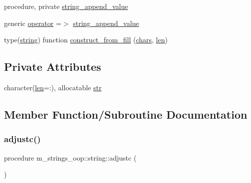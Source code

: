 \begin{DoxyCompactItemize}
procedure, private \mbox{\hyperlink{structm__strings__oop_1_1string_a8e08eb7c69c483503a9169375978cffd}{string\+\_\+append\+\_\+value}}
\item 
generic \mbox{\hyperlink{structm__strings__oop_1_1string_a079d7dd91faba60518e61f0634df7a6f}{operator}} =$>$ \mbox{\hyperlink{structm__strings__oop_1_1string_a8e08eb7c69c483503a9169375978cffd}{string\+\_\+append\+\_\+value}}
\item 
type(\mbox{\hyperlink{structm__strings__oop_1_1string}{string}}) function \mbox{\hyperlink{structm__strings__oop_1_1string_ab205d416fbeaaec946c2b847683d640e}{construct\+\_\+from\+\_\+fill}} (\mbox{\hyperlink{structm__strings__oop_1_1string_a84c1d60eaee6e6acc2dbee4bce6d64bb}{chars}}, \mbox{\hyperlink{structm__strings__oop_1_1string_acd9093a5a0ca686837cce1908846ae53}{len}})
\end{DoxyCompactItemize}
\subsection*{Private Attributes}
\begin{DoxyCompactItemize}
\item 
character(\mbox{\hyperlink{structm__strings__oop_1_1string_acd9093a5a0ca686837cce1908846ae53}{len}}=\+:), allocatable \mbox{\hyperlink{structm__strings__oop_1_1string_a52469ac69ef806468520b42894ca5e77}{str}}
\end{DoxyCompactItemize}


\subsection{Member Function/\+Subroutine Documentation}
\mbox{\label{structm__strings__oop_1_1string_a00b51e0438ecd366e3a42e28e7b2996b}} 
\subsubsection{\texorpdfstring{adjustc()}{adjustc()}}
{\footnotesize\ttfamily procedure m\+\_\+strings\+\_\+oop\+::string\+::adjustc (\begin{DoxyParamCaption}{ }\end{DoxyParamCaption})\hspace{0.3cm}{\ttfamily [private]}}

